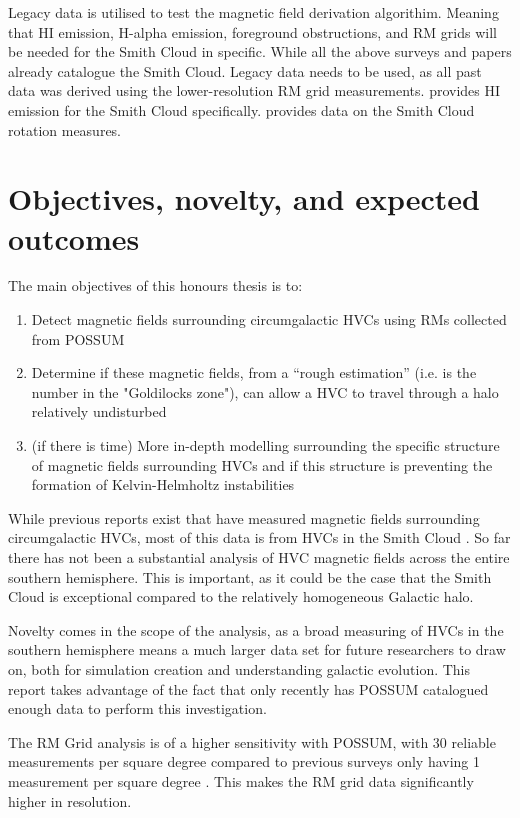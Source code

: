 Legacy data is utilised to test the magnetic field derivation algorithim. Meaning that HI emission, H-alpha emission, foreground obstructions, and RM grids will be needed for the Smith Cloud in specific. While all the above surveys and papers already catalogue the Smith Cloud. Legacy data needs to be used, as all past data was derived using the lower-resolution RM grid measurements. \citep{ID28} provides HI emission for the Smith Cloud specifically. \citep{ID18} provides data on the Smith Cloud rotation measures.

\section{Objectives, novelty, and expected outcomes}
\label{sec:objectives}

The main objectives of this honours thesis is to:
\begin{enumerate}
\item Detect magnetic fields surrounding circumgalactic HVCs using RMs collected from POSSUM
\item Determine if these magnetic fields, from a “rough estimation” (i.e. is the number in the "Goldilocks zone"), can allow a HVC to travel through a halo relatively undisturbed
\item (if there is time) More in-depth modelling surrounding the specific structure of magnetic fields surrounding HVCs and if this structure is preventing the formation of Kelvin-Helmholtz instabilities
\end{enumerate}

While previous reports exist that have measured magnetic fields surrounding circumgalactic HVCs, most of this data is from HVCs in the Smith Cloud \cite{ID2, ID5, ID23, ID26}. So far there has not been a substantial analysis of HVC magnetic fields  across the entire southern hemisphere. This is important, as it could be the case that the Smith Cloud is exceptional compared to the relatively homogeneous Galactic halo.

Novelty comes in the scope of the analysis, as a broad measuring of HVCs in the southern hemisphere means a much larger data set for future researchers to draw on, both for simulation creation and understanding galactic evolution. This report takes advantage of the fact that only recently has POSSUM catalogued enough data to perform this investigation.

The RM Grid analysis is of a higher sensitivity with POSSUM, with 30 reliable measurements per square degree compared to previous surveys only having 1 measurement per square degree \cite{ID18, ID1}. This makes the RM grid data significantly higher in resolution.

